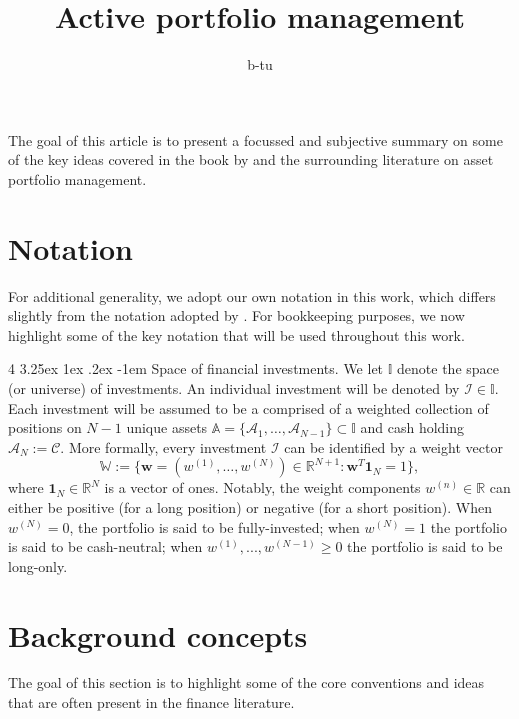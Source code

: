 \documentclass[12pt]{article}
\title{Active portfolio management}
\author{
	b-tu
}
\makeatletter
\renewcommand\paragraph{%
	\@startsection{paragraph}
	{4}
	{\z@}
	{3.25ex \@plus1ex \@minus.2ex}
	{-1em}
	{\normalfont\normalsize\bfseries\maybe@addperiod}%
}
\newcommand{\maybe@addperiod}[1]{%
	#1\@addpunct{.}%
}
\makeatother
\begin{document}
\maketitle
The goal of this article is to present a focussed and subjective summary on some of the key ideas covered in the book by \cite{grinold1999} and the surrounding literature on asset portfolio management.
\section{Notation}
For additional generality, we adopt our own notation in this work, which differs slightly from the notation adopted by \cite{grinold1999}. For bookkeeping purposes, we now highlight some of the key notation that will be used throughout this work.

\paragraph{Space of financial investments.} We let $\mathbb{I}$ denote the space (or universe) of investments. An individual investment will be denoted by $\mathcal{I} \in \mathbb{I}$. Each investment will be assumed to be a comprised of a weighted collection of positions on $N-1$ unique assets $\mathbb{A} = \{\mathcal{A}_1, \dots, \mathcal{A}_{N-1}\} \subset \mathbb{I}$ and cash holding$\mathcal{A}_N := \mathcal{C}$. More formally, every investment $\mathcal{I}$ can be identified by a weight vector 
\begin{equation}
	\mathbb{W} := \{\mathbf{w} = (w^{(1)},\dots, w^{(N)}) \in \mathbb{R}^{N+1}: \mathbf{w}^T \mathbf{1}_{N} = 1\},
\end{equation}
where $\mathbf{1}_N \in \mathbb{R}^{N}$ is a vector of ones. Notably, the weight components $w^{(n)} \in \mathbb{R}$ can either be positive (for a long position) or negative (for a short position). When $w^{(N)} = 0$, the portfolio is said to be fully-invested; when $w^{(N)} = 1$ the portfolio is said to be cash-neutral; when $w^{(1)},...,w^{(N-1)} \geq 0$ the portfolio is said to be long-only.
\section{Background concepts}
The goal of this section is to highlight some of the core conventions and ideas that are often present in the finance literature.
\end{document}
